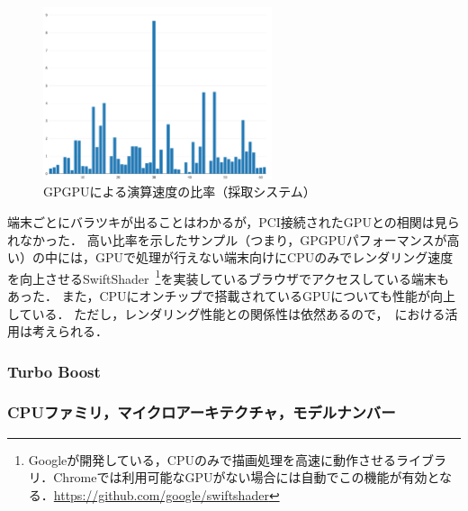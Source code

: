 \begin{figure}[H]
    \centering
    \includegraphics[width=0.6\textwidth,pagebox=cropbox]{fig/gpgpu_rst.pdf}
    \caption{GPGPUによる演算速度の比率（採取システム）}
    \label{fig-gpgpu_rst}
\end{figure}

端末ごとにバラツキが出ることはわかるが，PCI接続されたGPUとの相関は見られなかった．
高い比率を示したサンプル（つまり，GPGPUパフォーマンスが高い）の中には，GPUで処理が行えない端末向けにCPUのみでレンダリング速度を向上させるSwiftShader~\footnote{Googleが開発している，CPUのみで描画処理を高速に動作させるライブラリ．Chromeでは利用可能なGPUがない場合には自動でこの機能が有効となる．\url{https://github.com/google/swiftshader}}を実装しているブラウザでアクセスしている端末もあった．
また，CPUにオンチップで搭載されているGPUについても性能が向上している．
ただし，レンダリング性能との関係性は依然あるので，\fp~における活用は考えられる．

\subsubsection{Turbo Boost}
\subsubsection{CPUファミリ，マイクロアーキテクチャ，モデルナンバー}